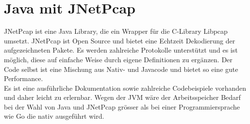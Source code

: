 \section{Java mit JNetPcap}
\label{sec:Java mit JNetPcap}

JNetPcap ist eine Java Library, die ein Wrapper für die C-Library Libpcap umsetzt. JNetPcap ist Open Source und bietet eine Echtzeit Dekodierung der aufgezeichneten Pakete.
Es werden zahlreiche Protokolle unterstützt und es ist möglich, diese auf einfache Weise durch eigene Definitionen zu ergänzen.
Der Code selbst ist eine Mischung aus Nativ- und Javacode und bietet so eine gute Performance.\\
Es ist eine ausführliche Dokumentation sowie zahlreiche Codebeispiele vorhanden und daher leicht zu erlernbar.
Wegen der \ac{JVM} wäre der Arbeitsspeicher Bedarf bei der Wahl von Java und JNetPcap grösser als bei einer Programmiersprache wie Go die nativ ausgeführt wird.
